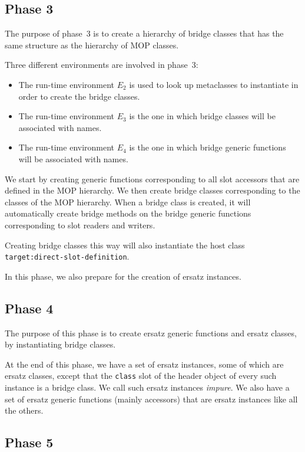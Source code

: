 \subsection{Phase 3}

The purpose of phase~3 is to create a hierarchy of bridge classes that
has the same structure as the hierarchy of MOP classes.

Three different environments are involved in phase~3:

\begin{itemize}
\item The run-time environment $E_2$ is used to look up metaclasses to
  instantiate in order to create the bridge classes.
\item The run-time environment $E_3$ is the one in which bridge
  classes will be associated with names.
\item The run-time environment $E_4$ is the one in which bridge
  generic functions will be associated with names.
\end{itemize}

We start by creating generic functions corresponding to all slot
accessors that are defined in the MOP hierarchy.  We then create
bridge classes corresponding to the classes of the MOP hierarchy.
When a bridge class is created, it will automatically create bridge
methods on the bridge generic functions corresponding to slot readers
and writers.

Creating bridge classes this way will also instantiate the host class
\texttt{target:direct-slot-definition}.

In this phase, we also prepare for the creation of ersatz instances.

\subsection{Phase 4}

The purpose of this phase is to create ersatz generic functions and
ersatz classes, by instantiating bridge classes.  

At the end of this phase, we have a set of ersatz instances, some of
which are ersatz classes, except that the \texttt{class} slot of the
header object of every such instance is a bridge class.  We call such
ersatz instances \emph{impure}.  We also have a set of ersatz generic
functions (mainly accessors) that are ersatz instances like all the
others.

\subsection{Phase 5}

